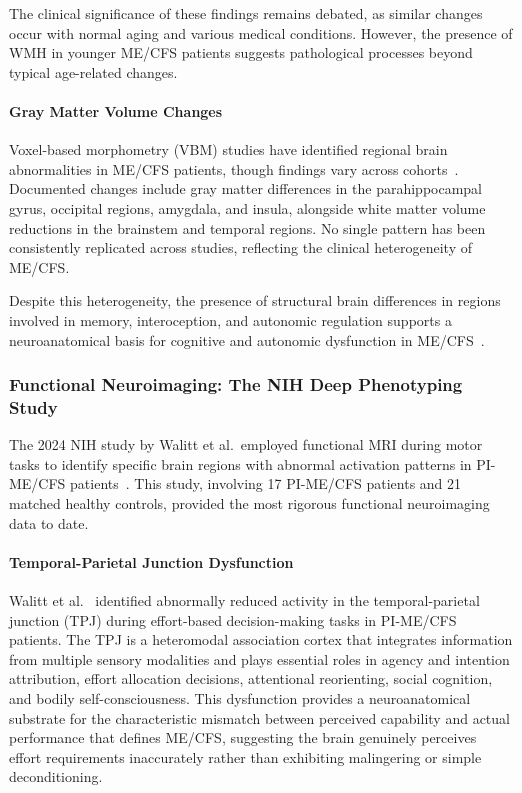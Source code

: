 The clinical significance of these findings remains debated, as similar changes occur with normal aging and various medical conditions. However, the presence of WMH in younger ME/CFS patients suggests pathological processes beyond typical age-related changes.

\paragraph{Gray Matter Volume Changes}
Voxel-based morphometry (VBM) studies have identified regional brain abnormalities in ME/CFS patients, though findings vary across cohorts~\cite{Puri2012VBM,Finkelmeyer2017VBM,Shan2020JTMneuroimaging}. Documented changes include gray matter differences in the parahippocampal gyrus, occipital regions, amygdala, and insula, alongside white matter volume reductions in the brainstem and temporal regions. No single pattern has been consistently replicated across studies, reflecting the clinical heterogeneity of ME/CFS.

Despite this heterogeneity, the presence of structural brain differences in regions involved in memory, interoception, and autonomic regulation supports a neuroanatomical basis for cognitive and autonomic dysfunction in ME/CFS~\cite{Shan2020JTMneuroimaging}.

\subsubsection{Functional Neuroimaging: The NIH Deep Phenotyping Study}
\label{sec:nih-fmri}

The 2024 NIH study by Walitt et al.\ employed functional MRI during motor tasks to identify specific brain regions with abnormal activation patterns in PI-ME/CFS patients~\cite{walitt2024deep}. This study, involving 17 PI-ME/CFS patients and 21 matched healthy controls, provided the most rigorous functional neuroimaging data to date.

\paragraph{Temporal-Parietal Junction Dysfunction}

\begin{achievement}
\label{ach:tpj-dysfunction}
Walitt et al.~\cite{walitt2024deep} identified abnormally reduced activity in the temporal-parietal junction (TPJ) during effort-based decision-making tasks in PI-ME/CFS patients. The TPJ is a heteromodal association cortex that integrates information from multiple sensory modalities and plays essential roles in agency and intention attribution, effort allocation decisions, attentional reorienting, social cognition, and bodily self-consciousness. This dysfunction provides a neuroanatomical substrate for the characteristic mismatch between perceived capability and actual performance that defines ME/CFS, suggesting the brain genuinely perceives effort requirements inaccurately rather than exhibiting malingering or simple deconditioning.
\end{achievement}

